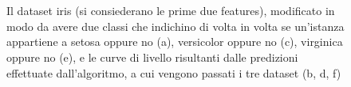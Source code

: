\documentclass[oneside, openany]{book}
\begin{document}
\begin{figure}[h]
		\\
		\quad 
		\\
		\caption{Il dataset iris (si consiederano le prime due features), modificato in modo da avere due classi che indichino di volta in volta se un'istanza appartiene a setosa oppure no (a), versicolor oppure no (c), virginica oppure no (e), e le curve di livello risultanti dalle predizioni effettuate dall'algoritmo, a cui vengono passati i tre dataset (b, d, f)}
		\label{fig:vis}
	\end{figure}
\end{document}
